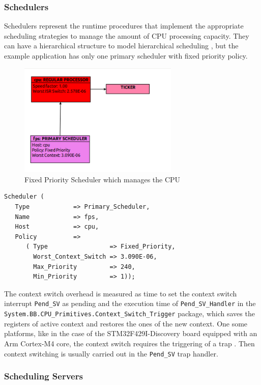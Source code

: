 \documentclass{article}
\begin{document}
\subsubsection{Schedulers}

Schedulers represent the runtime procedures that implement the appropriate scheduling strategies to manage the amount of CPU processing capacity. They can have a hierarchical structure to model hierarchical scheduling \cite{hierarchical-scheduling}, but the example application has only one primary scheduler with fixed priority policy.

\begin{figure}[!htbp]
\centering
\includegraphics[width=3in]{images/primary-scheduler}
\caption{Fixed Priority Scheduler which manages the CPU}
\label{primary-scheduler}
\end{figure}

\begin{lstlisting}
Scheduler (
   Type            => Primary_Scheduler,
   Name            => fps,
   Host            => cpu,
   Policy          =>
      ( Type                 => Fixed_Priority,
        Worst_Context_Switch => 3.090E-06,
        Max_Priority         => 240,
        Min_Priority         => 1));
\end{lstlisting}

The context switch overhead is measured as time to set the context switch interrupt \texttt{Pend\_SV} as pending and the execution time of \texttt{Pend\_SV\_Handler} in the \texttt{System.BB.CPU\_Primitives.Context\_Switch\_Trigger} package, which saves the registers of active context and restores the ones of the new context. One some platforms, like in the case of the STM32F429I-Discovery board equipped with an Arm Cortex-M4 core, the context switch requires the triggering of a trap \cite{pendsv}. Then context switching is usually carried out in the \texttt{Pend\_SV} trap handler.

\subsubsection{Scheduling Servers}
\end{document}
